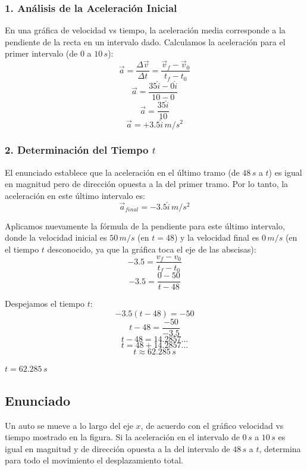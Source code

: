 \documentclass[12pt, a4paper]{article}
\begin{document}
\subsubsection*{1. Análisis de la Aceleración Inicial}
En una gráfica de velocidad vs tiempo, la aceleración media corresponde a la pendiente de la recta en un intervalo dado. 
Calculamos la aceleración para el primer intervalo (de $0$ a $10 \, \si{s}$):
$$ \vec{a} = \frac{\Delta \vec{v}}{\Delta t} = \frac{\vec{v}_f - \vec{v}_0}{t_f - t_0} $$
$$ \vec{a} = \frac{35\hat{i} - 0\hat{i}}{10 - 0} $$
$$ \vec{a} = \frac{35\hat{i}}{10} $$
$$ \vec{a} = +3.5\hat{i} \, \si{m/s^2} $$

\subsubsection*{2. Determinación del Tiempo $t$}
El enunciado establece que la aceleración en el último tramo (de $48 \, \si{s}$ a $t$) es igual en magnitud pero de dirección opuesta a la del primer tramo. Por lo tanto, la aceleración en este último intervalo es:
$$ \vec{a}_{final} = -3.5\hat{i} \, \si{m/s^2} $$

Aplicamos nuevamente la fórmula de la pendiente para este último intervalo, donde la velocidad inicial es $50 \, \si{m/s}$ (en $t=48$) y la velocidad final es $0 \, \si{m/s}$ (en el tiempo $t$ desconocido, ya que la gráfica toca el eje de las abscisas):
$$ -3.5 = \frac{v_f - v_0}{t_f - t_0} $$
$$ -3.5 = \frac{0 - 50}{t - 48} $$

Despejamos el tiempo $t$:
$$ -3.5 (t - 48) = -50 $$
$$ t - 48 = \frac{-50}{-3.5} $$
$$ t - 48 = 14.2857... $$
$$ t = 48 + 14.2857... $$
$$ t \approx 62.285 \, \si{s} $$

\begin{tcolorbox}[colback=green!5!white, colframe=green!50!black, title=Respuesta Final]
\centering \Large $t = 62.285 \, \si{s}$
\end{tcolorbox}

\newpage

\subsection*{Enunciado}
Un auto se mueve a lo largo del eje $x$, de acuerdo con el gráfico velocidad vs tiempo mostrado en la figura. Si la aceleración en el intervalo de $0 \, \si{s}$ a $10 \, \si{s}$ es igual en magnitud y de dirección opuesta a la del intervalo de $48 \, \si{s}$ a $t$, determina para todo el movimiento el desplazamiento total.
\end{document}
